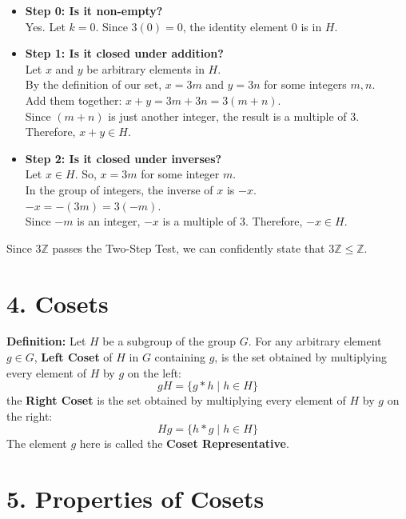 \documentclass[12pt]{article}
\begin{document}
\begin{itemize}
    \item \textbf{Step 0: Is it non-empty?} \\
          Yes. Let $k = 0$. Since $3(0) = 0$, the identity element $0$ is in $H$.

    \item \textbf{Step 1: Is it closed under addition?} \\
          Let $x$ and $y$ be arbitrary elements in $H$. \\
          By the definition of our set, $x = 3m$ and $y = 3n$ for some integers $m, n$. \\
          Add them together: $x + y = 3m + 3n = 3(m + n)$. \\
          Since $(m+n)$ is just another integer, the result is a multiple of 3. Therefore, $x+y \in H$.

    \item \textbf{Step 2: Is it closed under inverses?} \\
          Let $x \in H$. So, $x = 3m$ for some integer $m$. \\
          In the group of integers, the inverse of $x$ is $-x$. \\
          $-x = -(3m) = 3(-m)$. \\
          Since $-m$ is an integer, $-x$ is a multiple of 3. Therefore, $-x \in H$.
\end{itemize}

Since $3\mathbb{Z}$ passes the Two-Step Test, we can confidently state that $3\mathbb{Z} \leq \mathbb{Z}$.


\section*{4. Cosets}


\textbf{Definition:} Let $H$ be a subgroup of the group $G$.
For any arbitrary element $g \in G$, \textbf{Left Coset} of $H$ in $G$ containing $g$, is the set obtained by multiplying every element of $H$ by $g$ on the left:
$$ gH = \{g * h \mid h \in H\} $$
the \textbf{Right Coset} is the set obtained by multiplying every element of $H$ by $g$ on the right:
$$ Hg = \{h * g \mid h \in H\} $$
The element $g$ here is called the \textbf{Coset Representative}.


\section*{5. Properties of Cosets}
\end{document}
